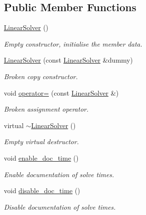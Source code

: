 \subsection*{Public Member Functions}
\begin{DoxyCompactItemize}
\item 
\hyperlink{classoomph_1_1LinearSolver_a6e7e8728f36c888f052e49df8624b8ca}{Linear\+Solver} ()
\begin{DoxyCompactList}\small\item\em Empty constructor, initialise the member data. \end{DoxyCompactList}\item 
\hyperlink{classoomph_1_1LinearSolver_a53c67c7ccd63b318f3af48e826ad57dc}{Linear\+Solver} (const \hyperlink{classoomph_1_1LinearSolver}{Linear\+Solver} \&dummy)
\begin{DoxyCompactList}\small\item\em Broken copy constructor. \end{DoxyCompactList}\item 
void \hyperlink{classoomph_1_1LinearSolver_aeb1820234b9335b2a5072e5ee19306d4}{operator=} (const \hyperlink{classoomph_1_1LinearSolver}{Linear\+Solver} \&)
\begin{DoxyCompactList}\small\item\em Broken assignment operator. \end{DoxyCompactList}\item 
virtual \hyperlink{classoomph_1_1LinearSolver_a9cc9b2c9a239777c4f9b15f26bb324a0}{$\sim$\+Linear\+Solver} ()
\begin{DoxyCompactList}\small\item\em Empty virtual destructor. \end{DoxyCompactList}\item 
void \hyperlink{classoomph_1_1LinearSolver_abeb9ef9127e927bf6df75d03645d6a81}{enable\+\_\+doc\+\_\+time} ()
\begin{DoxyCompactList}\small\item\em Enable documentation of solve times. \end{DoxyCompactList}\item 
void \hyperlink{classoomph_1_1LinearSolver_a91ffe51f3de82dad1a110c099f256d73}{disable\+\_\+doc\+\_\+time} ()
\begin{DoxyCompactList}\small\item\em Disable documentation of solve times. \end{DoxyCompactList}\item 

\end{DoxyCompactItemize}
